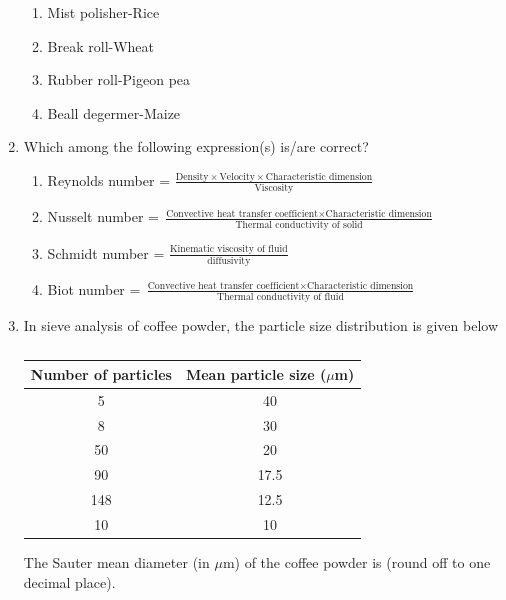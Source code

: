 \documentclass[a4paper,10pt]{article}
\begin{document}
\begin{enumerate}
\hfill{}
\begin{enumerate}
    \item Mist polisher-Rice
    \item Break roll-Wheat
    \item Rubber roll-Pigeon pea
    \item Beall degermer-Maize
\end{enumerate}

\item Which among the following expression(s) is/are correct?

\hfill{}
\begin{enumerate}
    \item Reynolds number = $\frac{\text{Density} \times \text{Velocity} \times \text{Characteristic dimension}}{\text{Viscosity}}$
    \item Nusselt number = $\frac{\text{Convective heat transfer coefficient} \times \text{Characteristic dimension}}{\text{Thermal conductivity of solid}}$
    \item Schmidt number = $\frac{\text{Kinematic viscosity of fluid}}{\text{diffusivity}}$
    \item Biot number = $\frac{\text{Convective heat transfer coefficient} \times \text{Characteristic dimension}}{\text{Thermal conductivity of fluid}}$
\end{enumerate}

\item In sieve analysis of coffee powder, the particle size distribution is given below
\begin{table}[h]
    \centering
    \begin{tabular}{|c|c|}
    \hline
    Number of particles & Mean particle size ($\mu$m) \\
    \hline
    5 & 40 \\
    8 & 30 \\
    50 & 20 \\
    90 & 17.5 \\
    148 & 12.5 \\
    10 & 10 \\
    \hline
    \end{tabular}
    \caption*{}
    \label{tab:q150}
\end{table}
The Sauter mean diameter (in $\mu$m) of the coffee powder is \underline{\hspace{2cm}}
(round off to one decimal place).

\hfill{}


\end{enumerate}
\end{document}
